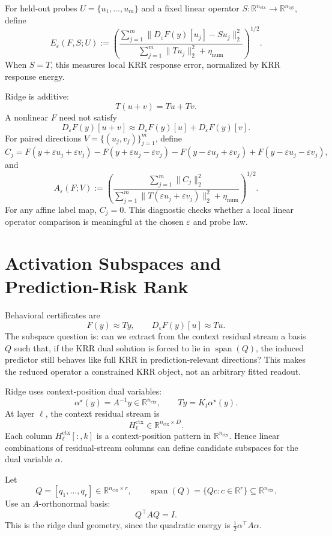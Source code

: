 \documentclass[11pt]{article}
\newcommand{\R}{\mathbb{R}}
\newcommand{\spanop}{\operatorname{span}}
\begin{document}
For held-out probes \(U=\{u_1,\ldots,u_m\}\) and a fixed linear operator
\(S:\R^{n_{\mathrm{ctx}}}\to\R^{n_{\mathrm{tgt}}}\), define
\[
E_\varepsilon(F,S;U)
:=
\left(
\frac{
\sum_{j=1}^m\|D_\varepsilon F(y)[u_j]-Su_j\|_2^2
}{
\sum_{j=1}^m\|Tu_j\|_2^2+\eta_{\mathrm{num}}
}
\right)^{1/2}.
\]
When \(S=T\), this measures local KRR response error, normalized by KRR response energy.

Ridge is additive:
\[
T(u+v)=Tu+Tv.
\]
A nonlinear \(F\) need not satisfy
\[
D_\varepsilon F(y)[u+v]\approx D_\varepsilon F(y)[u]+D_\varepsilon F(y)[v].
\]
For paired directions \(V=\{(u_j,v_j)\}_{j=1}^m\), define
\[
C_j =
F(y+\varepsilon u_j+\varepsilon v_j)
-F(y+\varepsilon u_j-\varepsilon v_j)
-F(y-\varepsilon u_j+\varepsilon v_j)
+F(y-\varepsilon u_j-\varepsilon v_j),
\]
and
\[
A_\varepsilon(F;V)
:=
\left(
\frac{
\sum_{j=1}^m\|C_j\|_2^2
}{
\sum_{j=1}^m\|T(\varepsilon u_j+\varepsilon v_j)\|_2^2+\eta_{\mathrm{num}}
}
\right)^{1/2}.
\]
For any affine label map, \(C_j=0\). This diagnostic checks whether a local linear operator
comparison is meaningful at the chosen \(\varepsilon\) and probe law.

\section{Activation Subspaces and Prediction-Risk Rank}

Behavioral certificates are
\[
F(y)\approx Ty,\qquad D_\varepsilon F(y)[u]\approx Tu.
\]
The subspace question is: can we extract from the context residual stream a basis \(Q\) such that,
if the KRR dual solution is forced to lie in \(\spanop(Q)\), the induced predictor still behaves
like full KRR in prediction-relevant directions? This makes the reduced operator a constrained KRR
object, not an arbitrary fitted readout.

Ridge uses context-position dual variables:
\[
\alpha^\star(y)=A^{-1}y\in\R^{n_{\mathrm{ctx}}},
\qquad
Ty=K_t\alpha^\star(y).
\]
At layer \(\ell\), the context residual stream is
\[
H_\ell^{\mathrm{ctx}}\in\R^{n_{\mathrm{ctx}}\times D}.
\]
Each column \(H_\ell^{\mathrm{ctx}}[:,k]\) is a context-position pattern in
\(\R^{n_{\mathrm{ctx}}}\). Hence linear combinations of residual-stream columns can define
candidate subspaces for the dual variable \(\alpha\).

Let
\[
Q=[q_1,\ldots,q_r]\in\R^{n_{\mathrm{ctx}}\times r},
\qquad
\spanop(Q)=\{Qc:c\in\R^r\}\subseteq\R^{n_{\mathrm{ctx}}}.
\]
Use an \(A\)-orthonormal basis:
\[
Q^\top A Q=I.
\]
This is the ridge dual geometry, since the quadratic energy is \(\frac12\alpha^\top A\alpha\).
\end{document}
